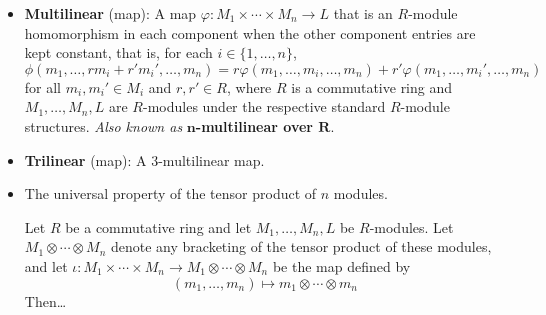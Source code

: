 \documentclass[../notes.tex]{subfiles}
\begin{document}
\begin{itemize}
\begin{theorem}
        \begin{equation*}
            (M\otimes_RN)\otimes_TL \cong M\otimes_R(N\otimes_TL)
        \end{equation*}
        of abelian groups such that $(m\otimes n)\otimes l\mapsto m\otimes(n\otimes l)$. If $M$ is an $(S,R)$-bimodule, then this is an isomorphism of $S$-modules.
        \begin{proof}
            Given.
        \end{proof}
    \end{theorem}
    \begin{corollary}\label{cly:10.15}
        Suppose $R$ is commutative and $M,N,L$ are $R$-modules. Then
        \begin{equation*}
            (M\otimes N)\otimes L \cong M\otimes(N\otimes L)
        \end{equation*}
        as $R$-modules for the standard $R$-module structures on $M,N,L$.
    \end{corollary}
    \item \textbf{Multilinear} (map): A map $\varphi:M_1\times\cdots\times M_n\to L$ that is an $R$-module homomorphism in each component when the other component entries are kept constant, that is, for each $i\in\{1,\dots,n\}$,
    \begin{equation*}
        \phi(m_1,\dots,rm_i+r'm_i',\dots,m_n) = r\varphi(m_1,\dots,m_i,\dots,m_n)+r'\varphi(m_1,\dots,m_i',\dots,m_n)
    \end{equation*}
    for all $m_i,m_i'\in M_i$ and $r,r'\in R$, where $R$ is a commutative ring and $M_1,\dots,M_n,L$ are $R$-modules under the respective standard $R$-module structures. \emph{Also known as} \textbf{$\bm{n}$-multilinear over $\bm{R}$}.
    \item \textbf{Trilinear} (map): A 3-multilinear map.
    \item The universal property of the tensor product of $n$ modules.
    \begin{corollary}\label{cly:10.16}
        Let $R$ be a commutative ring and let $M_1,\dots,M_n,L$ be $R$-modules. Let $M_1\otimes\cdots\otimes M_n$ denote any bracketing of the tensor product of these modules, and let $\iota:M_1\times\cdots\times M_n\to M_1\otimes\cdots\otimes M_n$ be the map defined by
        \begin{equation*}
            (m_1,\dots,m_n) \mapsto m_1\otimes\cdots\otimes m_n
        \end{equation*}
        Then\dots
        \begin{enumerate}

\end{enumerate}
\end{corollary}
\end{itemize}
\end{document}
